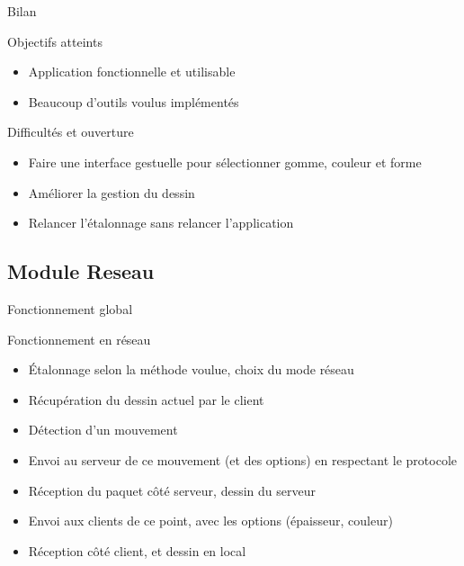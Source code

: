 \documentclass{beamer}
\begin{document}
		\begin{frame}{Bilan}
			\begin{exampleblock}{Objectifs atteints}
				\begin{itemize}
				\item Application fonctionnelle et utilisable
				\item Beaucoup d'outils voulus implémentés
				\end{itemize}
			\end{exampleblock}
			\pause
			\begin{alertblock}{Difficultés et ouverture}
				\begin{itemize}
				\item Faire une interface gestuelle pour sélectionner gomme, couleur et forme
				\item Améliorer la gestion du dessin
				\item Relancer l'étalonnage sans relancer l'application
				\end{itemize}
			\end{alertblock}
		\end{frame}

	\subsection{Module Reseau}
		\begin{frame}{Fonctionnement global}
			\begin{block}{Fonctionnement en réseau}
				\begin{itemize}
				\item Étalonnage selon la méthode voulue, choix du mode réseau
				\item Récupération du dessin actuel par le client
				\item Détection d'un mouvement
				\item Envoi au serveur de ce mouvement (et des options) en respectant le protocole
				\item Réception du paquet côté serveur, dessin du serveur
				\item Envoi aux clients de ce point, avec les options (épaisseur, couleur)
				\item Réception côté client, et dessin en local
				\end{itemize}
			\end{block}
		\end{frame}
		
\end{document}
